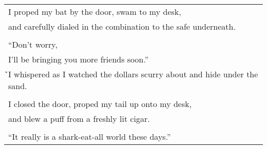 \documentclass{article}
\begin{document}
\begin{center}
\begin{tabular}{l}
\end{tabular}\\
\begin{tabular}{l}
I proped my bat by the door, swam to my desk, \\
and carefully dialed in the combination to the safe underneath. \\
\\
``Don't worry, \\
I'll be bringing you more friends soon.'' \\
\h\h{}I whispered as I watched the dollars scurry about and hide under the sand. \\
\\
I closed the door, proped my tail up onto my desk, \\
and blew a puff from a freshly lit cigar. \\
\\
``It really is a shark-eat-all world these days.'' \\
\end{tabular}
\end{center}
\end{document}
